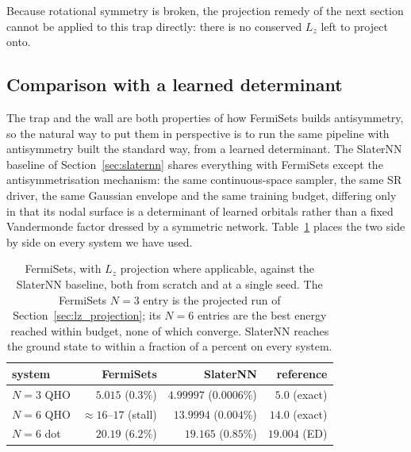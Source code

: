 \documentclass[a4paper,11pt,twoside]{article}
\begin{document}
Because rotational symmetry is broken, the projection remedy of the next section cannot be applied to this trap directly: there is no conserved $L_z$ left to project onto. 





\subsection{Comparison with a learned determinant}
\label{sec:slater_comparison}

The trap and the wall are both properties of how FermiSets builds antisymmetry, so the natural way to put them in perspective is to run the same pipeline with antisymmetry built the standard way, from a learned determinant. The SlaterNN baseline of Section~\ref{sec:slaternn} shares everything with FermiSets except the antisymmetrisation mechanism: the same continuous-space sampler, the same SR driver, the same Gaussian envelope and the same training budget, differing only in that its nodal surface is a determinant of learned orbitals rather than a fixed Vandermonde factor dressed by a symmetric network. Table~\ref{tab:slater_vs_fermisets} places the two side by side on every system we have used.

\begin{table}[H]
    \centering
    \begin{tabular}{l r r r}
        \hline
        system & FermiSets & SlaterNN & reference \\
        \hline
        $N=3$ QHO  & $5.015$ ($0.3\%$)          & $4.99997$ ($0.0006\%$) & $5.0$ (exact) \\
        $N=6$ QHO  & $\approx 16$--$17$ (stall)  & $13.9994$ ($0.004\%$)  & $14.0$ (exact) \\
        $N=6$ dot  & $20.19$ ($6.2\%$)          & $19.165$ ($0.85\%$)    & $19.004$ (ED) \\
        \hline
    \end{tabular}
    \caption{FermiSets, with $L_z$ projection where applicable, against the SlaterNN baseline, both from scratch and at a single seed. The FermiSets $N=3$ entry is the projected run of Section~\ref{sec:lz_projection}; its $N=6$ entries are the best energy reached within budget, none of which converge. SlaterNN reaches the ground state to within a fraction of a percent on every system.}
    \label{tab:slater_vs_fermisets}
\end{table}
\end{document}
